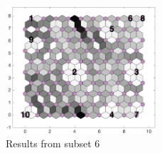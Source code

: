 \begin{figure}
        \centering
        \includegraphics[width=0.5\textwidth]{../../images0.01/M31/2D/image_subsets/subset4_dist_with_hits_t.png}
    \caption{Results from subset 6}
    \label{fig: subset4}
\end{figure}